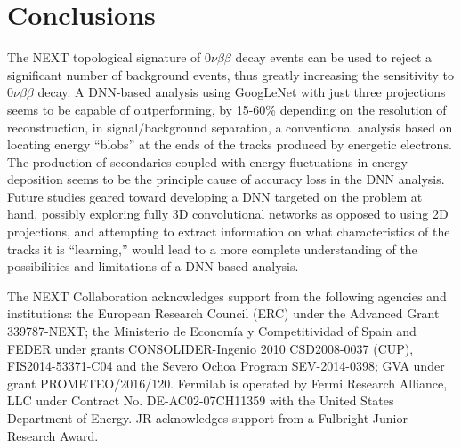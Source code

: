 \documentclass[a4paper,11pt]{article}
\begin{document}
\section{Conclusions}
The NEXT topological signature of $0\nu\beta\beta$ decay events can be used to reject a significant number of background events, thus greatly increasing the sensitivity to $0\nu\beta\beta$ decay.  A DNN-based analysis using GoogLeNet with just three projections seems to be capable of outperforming, by 15-60\% depending on the resolution of reconstruction, in signal/background separation, a conventional analysis based on locating energy ``blobs'' at the ends of the tracks produced by energetic electrons.  The production of secondaries coupled with energy fluctuations in energy deposition seems to be the principle cause of accuracy loss in the DNN analysis.  Future studies geared toward developing a DNN targeted on the problem at hand, possibly exploring fully 3D convolutional networks as opposed to using 2D projections, and attempting to extract information on what characteristics of the tracks it is ``learning,'' would lead to a more complete understanding of the possibilities and limitations of a DNN-based analysis.

\acknowledgments

The NEXT Collaboration acknowledges support from the following agencies and institutions:
the European Research Council (ERC) under the Advanced Grant 339787-NEXT;
the Ministerio de Econom\'{i}a y Competitividad of Spain and FEDER under grants CONSOLIDER-Ingenio
2010 CSD2008-0037 (CUP), FIS2014-53371-C04 and the Severo Ochoa Program
SEV-2014-0398; GVA under grant PROMETEO/2016/120. Fermilab is operated by Fermi Research Alliance, LLC under Contract No. DE-AC02-07CH11359 with the United States Department of 
Energy. JR acknowledges support from a Fulbright Junior Research Award.


\end{document}
